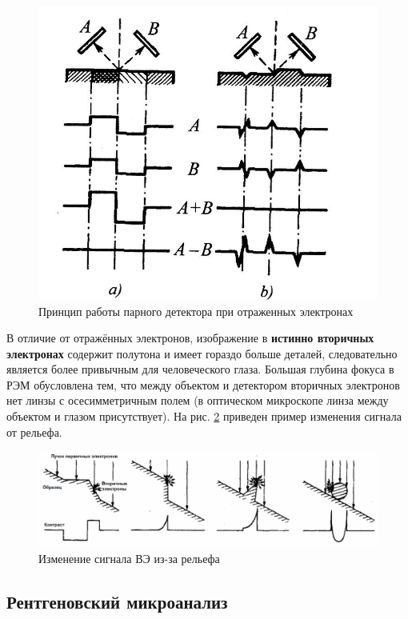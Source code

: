 \documentclass[a4paper]{article}
\begin{document}
\begin{figure}[H]
    \centering
    \includegraphics[scale = 0.2]{signal1_1.jpg}
    \caption{Принцип работы парного детектора при отраженных электронах}
    \label{signal1}
\end{figure}

В отличие от отражённых электронов, изображение в \textbf{истинно вторичных электронах} содержит полутона и имеет гораздо больше деталей, следовательно является более 
привычным для человеческого глаза. Большая глубина фокуса в РЭМ обусловлена тем, что между объектом и детектором вторичных электронов нет линзы с осесимметричным полем 
(в оптическом микроскопе линза между объектом и глазом присутствует). На рис. \ref{signal2} приведен пример изменения сигнала от рельефа.

\begin{figure}[H]
    \centering
    \includegraphics[scale = 0.5]{signal2.png}
    \caption{Изменение сигнала ВЭ из-за рельефа}
    \label{signal2}
\end{figure}

\subsection{Рентгеновский микроанализ}
\end{document}
